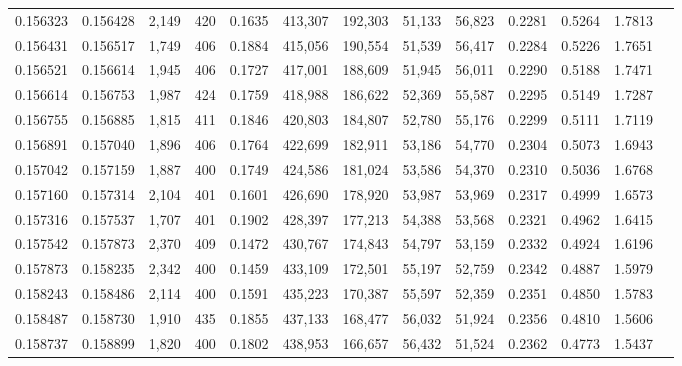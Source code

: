 \begin{tabular}{rrrrrrrrrrrrr}
0.156323 & 0.156428 & 2,149 & 420 &                                     0.1635 & 413,307 & 192,303 &  51,133 &  56,823 & 0.2281 & 0.5264 & 1.7813 \\
0.156431 & 0.156517 & 1,749 & 406 &                                     0.1884 & 415,056 & 190,554 &  51,539 &  56,417 & 0.2284 & 0.5226 & 1.7651 \\
0.156521 & 0.156614 & 1,945 & 406 &                                     0.1727 & 417,001 & 188,609 &  51,945 &  56,011 & 0.2290 & 0.5188 & 1.7471 \\
0.156614 & 0.156753 & 1,987 & 424 &                                     0.1759 & 418,988 & 186,622 &  52,369 &  55,587 & 0.2295 & 0.5149 & 1.7287 \\
0.156755 & 0.156885 & 1,815 & 411 &                                     0.1846 & 420,803 & 184,807 &  52,780 &  55,176 & 0.2299 & 0.5111 & 1.7119 \\
0.156891 & 0.157040 & 1,896 & 406 &                                     0.1764 & 422,699 & 182,911 &  53,186 &  54,770 & 0.2304 & 0.5073 & 1.6943 \\
0.157042 & 0.157159 & 1,887 & 400 &                                     0.1749 & 424,586 & 181,024 &  53,586 &  54,370 & 0.2310 & 0.5036 & 1.6768 \\
0.157160 & 0.157314 & 2,104 & 401 &                                     0.1601 & 426,690 & 178,920 &  53,987 &  53,969 & 0.2317 & 0.4999 & 1.6573 \\
0.157316 & 0.157537 & 1,707 & 401 &                                     0.1902 & 428,397 & 177,213 &  54,388 &  53,568 & 0.2321 & 0.4962 & 1.6415 \\
0.157542 & 0.157873 & 2,370 & 409 &                                     0.1472 & 430,767 & 174,843 &  54,797 &  53,159 & 0.2332 & 0.4924 & 1.6196 \\
0.157873 & 0.158235 & 2,342 & 400 &                                     0.1459 & 433,109 & 172,501 &  55,197 &  52,759 & 0.2342 & 0.4887 & 1.5979 \\
0.158243 & 0.158486 & 2,114 & 400 &                                     0.1591 & 435,223 & 170,387 &  55,597 &  52,359 & 0.2351 & 0.4850 & 1.5783 \\
0.158487 & 0.158730 & 1,910 & 435 &                                     0.1855 & 437,133 & 168,477 &  56,032 &  51,924 & 0.2356 & 0.4810 & 1.5606 \\
0.158737 & 0.158899 & 1,820 & 400 &                                     0.1802 & 438,953 & 166,657 &  56,432 &  51,524 & 0.2362 & 0.4773 & 1.5437 \\

\end{tabular}
